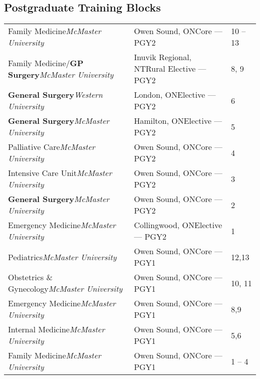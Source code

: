 \documentclass[a4paper,10pt,oneside,onecolumn,draft]{article} %
\begin{document}
\subsection*{Postgraduate Training \hfill \normalfont \small \bfseries Blocks \hspace{26pt}}
\begin{supertabular*}{1\textwidth}{F@{}G@{\SubVRule}H}
  {Family Medicine}\hfill{\slshape McMaster University\/}&{Owen Sound, ON}\hfill{Core --- PGY2}&10 -- 13\\
  {Family Medicine/\bfseries GP Surgery}\hfill{\slshape McMaster University\/}&{Inuvik Regional, NT}\hfill{Rural Elective --- PGY2}&8, 9\\
  {\bfseries General Surgery}\hfill{\slshape Western University\/}&{London, ON}\hfill{Elective --- PGY2}&6\\
  {\bfseries General Surgery}\hfill{\slshape McMaster University\/}&{Hamilton, ON}\hfill{Elective --- PGY2}&5\\
  {Palliative Care}\hfill{\slshape McMaster University\/}&{Owen Sound, ON}\hfill{Core --- PGY2}&4\\
  {Intensive Care Unit}\hfill{\slshape McMaster University\/}&{Owen Sound, ON}\hfill{Core --- PGY2}&3\\
  {\bfseries General Surgery}\hfill{\slshape McMaster University\/}&{Owen Sound, ON}\hfill{Core --- PGY2}&2\\
  {Emergency Medicine}\hfill{\slshape McMaster University\/}&{Collingwood, ON}\hfill{Elective --- PGY2}&1\\
  {Pediatrics}\hfill{\slshape McMaster University\/}&{Owen Sound, ON}\hfill{Core --- PGY1}&12,13\\
  {Obstetrics \& Gynecology}\hfill{\slshape McMaster University\/}&{Owen Sound, ON}\hfill{Core --- PGY1}&10, 11\\
  {Emergency Medicine}\hfill{\slshape McMaster University\/}&{Owen Sound, ON}\hfill{Core --- PGY1}&8,9\\
  {Internal Medicine}\hfill{\slshape McMaster University\/}&{Owen Sound, ON}\hfill{Core --- PGY1}&5,6\\
  {Family Medicine}\hfill{\slshape McMaster University\/}&{Owen Sound, ON}\hfill{Core --- PGY1}&1 -- 4\\
\end{supertabular*}


\end{document}
